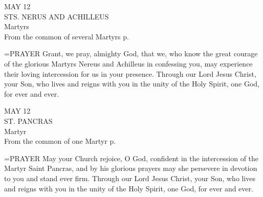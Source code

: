 \begin{center}\normalsize MAY 12\\
\footnotesize STS. NERUS AND ACHILLEUS\\
\footnotesize Martyrs\\
\footnotesize From the common of several Martyrs p. \\
\end{center}

\hangindent=\parindent \small{PRAYER 
Grant, we pray, almighty God,
that we, who know the great courage
of the glorious Martyrs Nereus and Achilleus
in confessing you,
may experience their loving intercession for us in your presence.
Through our Lord Jesus Christ, your Son,
who lives and reigns with you in the unity of the Holy Spirit,
one God, for ever and ever.\\}
 
\begin{center}\normalsize MAY 12\\
\footnotesize ST. PANCRAS\\
\footnotesize Martyr\\
\footnotesize From the common of one Martyr p. \\
\end{center}

\hangindent=\parindent \small{PRAYER 
May your Church rejoice, O God,
confident in the intercession of the Martyr Saint Pancras,
and by his glorious prayers
may she persevere in devotion to you
and stand ever firm.
Through our Lord Jesus Christ, your Son,
who lives and reigns with you in the unity of the Holy Spirit,
one God, for ever and ever.\\}
 
